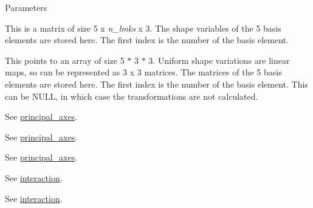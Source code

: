 \begin{DoxyParams}{Parameters}
\item[\mbox{\tt[out]} {\em basis}]This is a matrix of size 5 x {\itshape n\_\-lmks\/} x 3. The shape variables of the 5 basis elements are stored here. The first index is the number of the basis element. \item[\mbox{\tt[out]} {\em transforms\_\-opt}]This points to an array of size 5 $\ast$ 3 $\ast$ 3. Uniform shape variations are linear maps, so can be represented as 3 x 3 matrices. The matrices of the 5 basis elements are stored here. The first index is the number of the basis element. This can be {\ttfamily NULL}, in which case the transformations are not calculated. \item[\mbox{\tt[in]} {\em centroid}]See \hyperlink{classew_1_1Tps3_a02aeaf33e23f589c11ac000452a76775}{principal\_\-axes}. \item[\mbox{\tt[in]} {\em sum\_\-squares}]See \hyperlink{classew_1_1Tps3_a02aeaf33e23f589c11ac000452a76775}{principal\_\-axes}. \item[\mbox{\tt[in]} {\em axes}]See \hyperlink{classew_1_1Tps3_a02aeaf33e23f589c11ac000452a76775}{principal\_\-axes}. \item[\mbox{\tt[in]} {\em lmks}]See \hyperlink{classew_1_1Tps3_add5597fd0edb1437c9694d765c507aff}{interaction}. \item[\mbox{\tt[in]} {\em n\_\-lmks}]See \hyperlink{classew_1_1Tps3_add5597fd0edb1437c9694d765c507aff}{interaction}. \end{DoxyParams}
